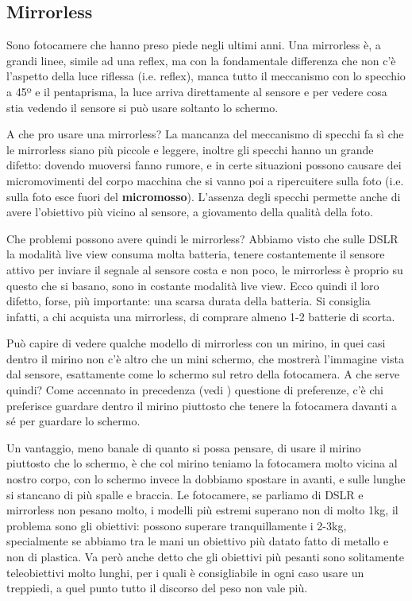 \subsection{Mirrorless} \label{subsec:mirrorless}
Sono fotocamere che hanno preso piede negli ultimi anni. Una mirrorless è, a grandi linee, simile ad una reflex, ma con la fondamentale differenza che non c'è l'aspetto della luce riflessa (i.e. reflex), manca tutto il meccanismo con lo specchio a 45º e il pentaprisma, la luce arriva direttamente al sensore e per vedere cosa stia vedendo il sensore si può usare soltanto lo schermo.

A che pro usare una mirrorless? La mancanza del meccanismo di specchi fa sì che le mirrorless siano più piccole e leggere, inoltre gli specchi hanno un grande difetto: dovendo muoversi fanno rumore, e in certe situazioni possono
causare dei micromovimenti del corpo macchina che si vanno poi a ripercuitere sulla foto (i.e. sulla foto esce fuori del \textbf{micromosso}).\newline
L'assenza degli specchi permette anche di avere l'obiettivo più vicino al sensore, a giovamento della qualità della foto.

Che problemi possono avere quindi le mirrorless? Abbiamo visto che sulle DSLR la modalità live view consuma molta batteria, tenere costantemente il sensore attivo per inviare il segnale al sensore costa e non poco, le mirrorless è proprio su questo che si basano, sono in costante modalità live view. Ecco quindi il loro difetto, forse, più importante: una scarsa durata della batteria. Si consiglia infatti, a chi acquista una mirrorless, di comprare almeno 1-2 batterie di scorta.

Può capire di vedere qualche modello di mirrorless con un mirino, in quei casi dentro il mirino non c'è altro che un mini schermo, che mostrerà l'immagine vista dal sensore, esattamente come lo schermo sul retro della fotocamera.
A che serve quindi? Come accennato in precedenza (vedi ) questione di preferenze, c'è chi preferisce guardare dentro il mirino piuttosto che tenere la fotocamera davanti a sé per guardare lo schermo.

Un vantaggio, meno banale di quanto si possa pensare, di usare il mirino piuttosto che lo schermo, è che col mirino teniamo la fotocamera molto vicina al nostro corpo, con lo schermo invece la dobbiamo spostare in avanti, e sulle lunghe si stancano di più spalle e braccia. Le fotocamere, se parliamo di DSLR e mirrorless non pesano molto, i modelli più estremi superano non di molto 1kg, il problema sono gli obiettivi: possono superare tranquillamente i 2-3kg, specialmente se abbiamo tra le mani un obiettivo più datato fatto di metallo e non di plastica.
Va però anche detto che gli obiettivi più pesanti sono solitamente teleobiettivi molto lunghi, per i quali è consigliabile in ogni caso usare un treppiedi, a quel punto tutto il discorso del peso non vale più.